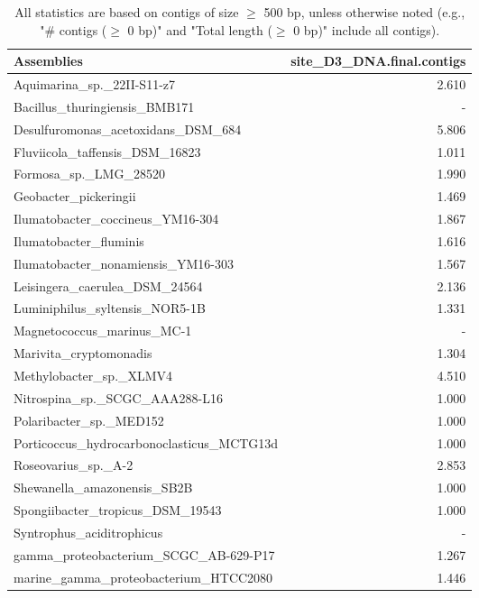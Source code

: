 \documentclass[12pt,a4paper]{article}
\begin{document}
\begin{table}[ht]
\begin{center}
\caption{All statistics are based on contigs of size $\geq$ 500 bp, unless otherwise noted (e.g., "\# contigs ($\geq$ 0 bp)" and "Total length ($\geq$ 0 bp)" include all contigs).}
\begin{tabular}{|l*{1}{|r}|}
\hline
Assemblies & site\_D3\_DNA.final.contigs \\ \hline
Aquimarina\_sp.\_22II-S11-z7 & 2.610 \\ \hline
Bacillus\_thuringiensis\_BMB171 & - \\ \hline
Desulfuromonas\_acetoxidans\_DSM\_684 & 5.806 \\ \hline
Fluviicola\_taffensis\_DSM\_16823 & 1.011 \\ \hline
Formosa\_sp.\_LMG\_28520 & 1.990 \\ \hline
Geobacter\_pickeringii & 1.469 \\ \hline
Ilumatobacter\_coccineus\_YM16-304 & 1.867 \\ \hline
Ilumatobacter\_fluminis & 1.616 \\ \hline
Ilumatobacter\_nonamiensis\_YM16-303 & 1.567 \\ \hline
Leisingera\_caerulea\_DSM\_24564 & 2.136 \\ \hline
Luminiphilus\_syltensis\_NOR5-1B & 1.331 \\ \hline
Magnetococcus\_marinus\_MC-1 & - \\ \hline
Marivita\_cryptomonadis & 1.304 \\ \hline
Methylobacter\_sp.\_XLMV4 & 4.510 \\ \hline
Nitrospina\_sp.\_SCGC\_AAA288-L16 & 1.000 \\ \hline
Polaribacter\_sp.\_MED152 & 1.000 \\ \hline
Porticoccus\_hydrocarbonoclasticus\_MCTG13d & 1.000 \\ \hline
Roseovarius\_sp.\_A-2 & 2.853 \\ \hline
Shewanella\_amazonensis\_SB2B & 1.000 \\ \hline
Spongiibacter\_tropicus\_DSM\_19543 & 1.000 \\ \hline
Syntrophus\_aciditrophicus & - \\ \hline
gamma\_proteobacterium\_SCGC\_AB-629-P17 & 1.267 \\ \hline
marine\_gamma\_proteobacterium\_HTCC2080 & 1.446 \\ \hline
\end{tabular}
\end{center}
\end{table}
\end{document}
